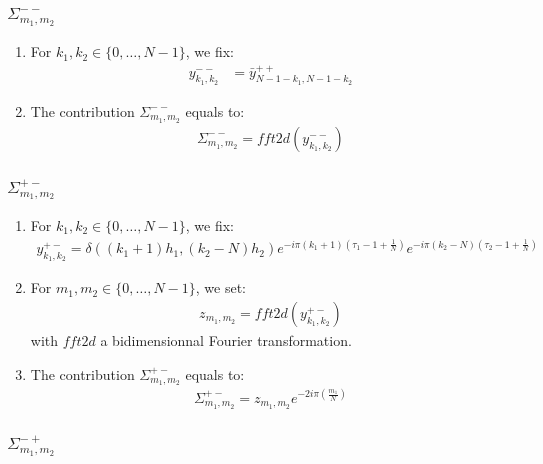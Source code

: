 \subsubsection{$\Sigma_{m_1,m_2}^{--}$}

\begin{enumerate}
\item For $k_1,k_2\in\{0,\hdots,N-1\}$, we fix:
\begin{align*}
y^{--}_{k_1,k_2}&=\bar{y}^{++}_{N-1-k_1,N-1-k_2}
\end{align*}
\item The contribution $\Sigma_{m_1,m_2}^{--}$ equals to:
\begin{align*}
  \Sigma_{m_1,m_2}^{--}=fft2d(y^{--}_{k_1,k_2})
\end{align*}
\end{enumerate}

\subsubsection{$\Sigma_{m_1,m_2}^{+-}$}

\begin{enumerate}
\item For $k_1,k_2\in\{0,\hdots,N-1\}$, we fix:
\begin{align*}
y^{+-}_{k_1,k_2}= \delta((k_1+1)h_1,(k_2-N)h_2)e^{-i\pi (k_1+1)\left(\tau_1-1+\frac{1}{N}\right)}e^{-i\pi (k_2-N)\left(\tau_2-1+\frac{1}{N}\right)}
\end{align*}
\item For $m_1,m_2\in\{0,\hdots,N-1\}$, we set:
\begin{align*}
  z_{m_1,m_2}=fft2d(y^{+-}_{k_1,k_2})
\end{align*}
with $fft2d$ a bidimensionnal Fourier transformation.
\item The contribution $\Sigma_{m_1,m_2}^{+-}$ equals to:
\begin{align*}
  \Sigma_{m_1,m_2}^{+-}=z_{m_1,m_2}e^{-2i\pi\left(\frac{m_1}{N}\right)}
\end{align*}
\end{enumerate}


\subsubsection{$\Sigma_{m_1,m_2}^{-+}$}

